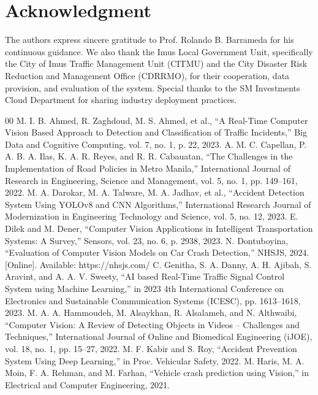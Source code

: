 \documentclass[conference]{IEEEtran}
\begin{document}
\section*{Acknowledgment}
The authors express sincere gratitude to Prof. Rolando B. Barrameda for his continuous guidance. We also thank the Imus Local Government Unit, specifically the City of Imus Traffic Management Unit (CITMU) and the City Disaster Risk Reduction and Management Office (CDRRMO), for their cooperation, data provision, and evaluation of the system. Special thanks to the SM Investments Cloud Department for sharing industry deployment practices. 

\begin{thebibliography}{00}
 M. I. B. Ahmed, R. Zaghdoud, M. S. Ahmed, et al., ``A Real-Time Computer Vision Based Approach to Detection and Classification of Traffic Incidents,'' Big Data and Cognitive Computing, vol. 7, no. 1, p. 22, 2023.
 A. M. C. Capellan, P. A. B. A. Ilas, K. A. R. Reyes, and R. R. Cabauatan, ``The Challenges in the Implementation of Road Policies in Metro Manila,'' International Journal of Research in Engineering, Science and Management, vol. 5, no. 1, pp. 149--161, 2022.
 M. A. Darokar, M. A. Talware, M. A. Jadhav, et al., ``Accident Detection System Using YOLOv8 and CNN Algorithms,'' International Research Journal of Modernization in Engineering Technology and Science, vol. 5, no. 12, 2023.
 E. Dilek and M. Dener, ``Computer Vision Applications in Intelligent Transportation Systems: A Survey,'' Sensors, vol. 23, no. 6, p. 2938, 2023.
 N. Dontuboyina, ``Evaluation of Computer Vision Models on Car Crash Detection,'' NHSJS, 2024. [Online]. Available: https://nhsjs.com/
 C. Genitha, S. A. Danny, A. H. Ajibah, S. Aravint, and A. A. V. Sweety, ``AI based Real-Time Traffic Signal Control System using Machine Learning,'' in 2023 4th International Conference on Electronics and Sustainable Communication Systems (ICESC), pp. 1613--1618, 2023.
 M. A. A. Hammoudeh, M. Alsaykhan, R. Alsalameh, and N. Althwaibi, ``Computer Vision: A Review of Detecting Objects in Videos – Challenges and Techniques,'' International Journal of Online and Biomedical Engineering (iJOE), vol. 18, no. 1, pp. 15--27, 2022.
 M. F. Kabir and S. Roy, ``Accident Prevention System Using Deep Learning,'' in Proc. Vehicular Safety, 2022.
 M. Haris, M. A. Moin, F. A. Rehman, and M. Farhan, ``Vehicle crash prediction using Vision,'' in Electrical and Computer Engineering, 2021.

\end{thebibliography}
\end{document}
